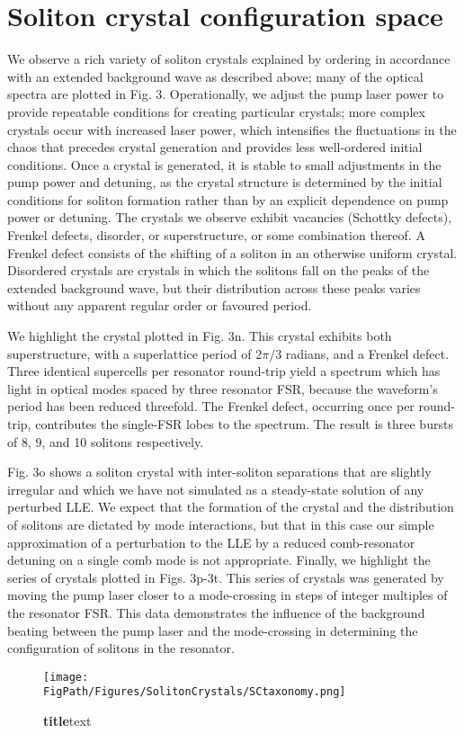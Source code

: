  
\section{Soliton crystal configuration space}\label{SCtaxonomy}

We observe a rich variety of soliton crystals explained by ordering in accordance with an extended background wave as described above; many of the optical spectra are plotted in Fig. 3. Operationally, we adjust the pump laser power to provide repeatable conditions for creating particular crystals; more complex crystals occur with increased laser power, which intensifies the fluctuations in the chaos that precedes crystal generation and provides less well-ordered initial conditions. Once a crystal is generated, it is stable to small adjustments in the pump power and detuning, as the crystal structure is determined by the initial conditions for soliton formation rather than by an explicit dependence on pump power or detuning. The crystals we observe exhibit vacancies (Schottky defects)\cite{27}, Frenkel defects\cite{27}, disorder, or superstructure, or some combination thereof. A Frenkel defect consists of the shifting of a soliton in an otherwise uniform crystal. Disordered crystals are crystals in which the solitons fall on the peaks of the extended background wave, but their distribution across these peaks varies without any apparent regular order or favoured period. 

We highlight the crystal plotted in Fig. 3n. This crystal exhibits both superstructure, with a superlattice period of $2\pi/3$ radians, and a Frenkel defect. Three identical supercells per resonator round-trip yield a spectrum which has light in optical modes spaced by three resonator FSR, because the waveform’s period has been reduced threefold. The Frenkel defect, occurring once per round-trip, contributes the single-FSR lobes to the spectrum. The result is three bursts of 8, 9, and 10 solitons respectively. 	

Fig. 3o shows a soliton crystal with inter-soliton separations that are slightly irregular and which we have not simulated as a steady-state solution of any perturbed LLE. We expect that the formation of the crystal and the distribution of solitons are dictated by mode interactions, but that in this case our simple approximation of a perturbation to the LLE by a reduced comb-resonator detuning on a single comb mode is not appropriate.
Finally, we highlight the series of crystals plotted in Figs. 3p-3t. This series of crystals was generated by moving the pump laser closer to a mode-crossing in steps of integer multiples of the resonator FSR. This data demonstrates the influence of the background beating between the pump laser and the mode-crossing in determining the configuration of solitons in the resonator.


\begin{sidewaysfigure}[htpb]
	\begin{center}
		\texttt{[image: \\FigPath/Figures/SolitonCrystals/SCtaxonomy.png]}
	\end{center}
	\caption[Figure Title]{\textbf{title}text}
	\label{fig:SCtaxonomy}
\end{sidewaysfigure}




